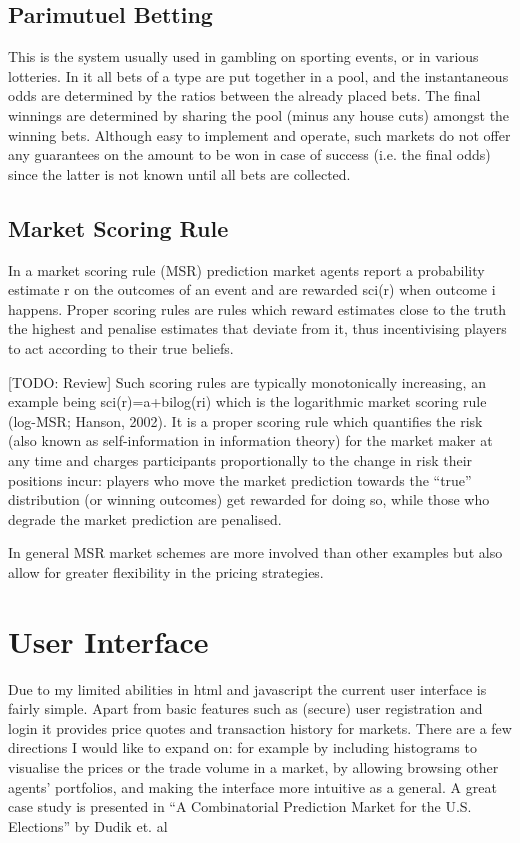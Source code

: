 \documentclass[bsc,frontabs,twoside,singlespacing,parskip,deptreport]{infthesis}     %
\begin{document}
\subsection{Parimutuel Betting}
This is the system usually used in gambling on sporting events, or in various lotteries. In it all bets of a type are put together in a pool, and the instantaneous odds are determined by the ratios between the already placed bets. The final winnings are determined by sharing the pool (minus any house cuts) amongst the winning bets. Although easy to implement and operate, such markets do not offer any guarantees on the amount to be won in case of success (i.e. the final odds) since the latter is not known until all bets are collected.

\subsection{Market Scoring Rule}
In a market scoring rule (MSR) prediction market agents report a probability estimate r on the outcomes of an event and are rewarded sci(r) when outcome i happens. Proper scoring rules are rules which reward estimates close to the truth the highest and penalise estimates that deviate from it, thus incentivising players to act according to their true beliefs.

 [TODO: Review] Such scoring rules are typically monotonically increasing, an example being sci(r)=a+bilog(ri) which is the logarithmic market scoring rule (log-MSR; Hanson, 2002). It is a proper scoring rule which quantifies the risk (also known as self-information in information theory) for the market maker at any time and charges participants proportionally to the change in risk their positions incur: players who move the market prediction towards the “true” distribution (or winning outcomes) get rewarded for doing so, while those who degrade the market prediction are penalised.

In general MSR market schemes are more involved than other examples but also allow for greater flexibility in the pricing strategies. 

\section{User Interface}

	Due to my limited abilities in html and javascript the current user interface is fairly simple. Apart from basic features such as (secure) user registration and login it provides price quotes and transaction history for markets. There are a few directions I would like to expand on: for example by including histograms to visualise the prices or the trade volume in a market, by allowing browsing other agents’ portfolios, and making the interface more intuitive as a general. A great case study is presented in “A Combinatorial Prediction Market for the U.S. Elections” by Dudik et. al
\end{document}
